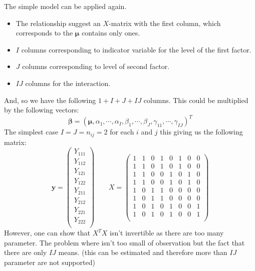 \begin{remark}
    The simple model can be applied again. 
    \begin{itemize}
        \item The relationship suggest an $X$-matrix with the first column, which corresponds to the $\boldsymbol \mu$ contains only ones. 
        \item $I$ columns corresponding to indicator variable for the level of the first factor. 
        \item $J$ columns corresponding to level of second factor. 
        \item $IJ$ columns for the interaction. 
    \end{itemize}
    And, so we have the following $1+I+J+IJ$ columns. This could be multiplied by the following vectors:
    \begin{equation*}
        \boldsymbol \beta = (\boldsymbol \mu, \alpha_1, \cdots, \alpha_I, \beta_1,\cdots,\beta_J,\gamma_{11},\cdots,\gamma_{IJ})^T
    \end{equation*}
    The simplest case $I = J = n_{ij} = 2$ for each $i$ and $j$ this giving us the following matrix:
    \begin{equation*}
        \boldsymbol y = \begin{pmatrix}
            Y_{111} \\ 
            Y_{112} \\ 
            Y_{121} \\ 
            Y_{122} \\ 
            Y_{211} \\ 
            Y_{212} \\ 
            Y_{221} \\ 
            Y_{222} \\ 
        \end{pmatrix} \qquad X = \begin{pmatrix}
            1 & 1 & 0 & 1 & 0 & 1 & 0 & 0 \\
            1 & 1 & 0 & 1 & 0 & 1 & 0 & 0 \\
            1 & 1 & 0 & 0 & 1 & 0 & 1 & 0 \\
            1 & 1 & 0 & 0 & 1 & 0 & 1 & 0 \\
            1 & 0 & 1 & 1 & 0 & 0 & 0 & 0 \\
            1 & 0 & 1 & 1 & 0 & 0 & 0 & 0 \\
            1 & 0 & 1 & 0 & 1 & 0 & 0 & 1 \\
            1 & 0 & 1 & 0 & 1 & 0 & 0 & 1 \\
        \end{pmatrix}
    \end{equation*}
    However, one can show that $X^TX$ isn't invertible as there are too many parameter. The problem where isn't too small of observation but the fact that there are only $IJ$ means. (this can be estimated and therefore more than $IJ$ parameter are not supported)
\end{remark}

